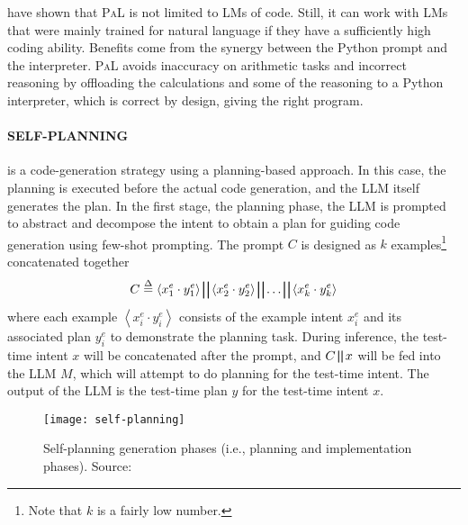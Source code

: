 \textcite{gao2022pal} have shown that \textsc{PaL} is not limited to LMs of code.
Still, it can work with LMs that were mainly trained for natural language if they have a sufficiently high coding ability.
Benefits come from the synergy between the Python prompt and the interpreter.
\textsc{PaL} avoids inaccuracy on arithmetic tasks and incorrect reasoning by offloading the calculations and some of the reasoning to a Python interpreter, which is correct by design, giving the right program.

\paragraph{SELF-PLANNING}
\label{par:self-planning}

is a code-generation strategy using a planning-based approach.
In this case, the planning is executed before the actual code generation, and the LLM itself generates the plan.
In the first stage, the planning phase, the LLM is prompted to abstract and decompose the intent to obtain a plan for guiding code generation using few-shot prompting.
The prompt $C$ is designed as $k$ examples\footnote{Note that $k$ is a fairly low number.} concatenated together
\begin{equation}
	C \stackrel{\Delta}{=} \left\langle x^e_1 \cdot y^e_1 \right\rangle \bigparallel \left\langle x^e_2 \cdot y^e_2 \right\rangle \bigparallel \ldots \bigparallel \left\langle x^e_k \cdot y^e_k \right\rangle
	\label{eq:self-planning-eq}
\end{equation}
where each example $\left\langle x^e_i \cdot y^e_i \right\rangle$ consists of the example intent $x^e_i$ and its associated plan $y^e_i$ to demonstrate the planning task.
During inference, the test-time intent $x$ will be concatenated after the prompt, and $C \bigparallel x$ will be fed into the LLM $M$, which will attempt to do planning for the test-time intent.
The output of the LLM is the test-time plan $y$ for the test-time intent $x$.

\begin{figure}[h!]
	\centering
	\texttt{[image: self-planning]}
	\caption{Self-planning generation phases (i.e., planning and implementation phases). Source: \textcite{jiang2024selfplanning}}
	\label{fig:self-planning}
\end{figure}

